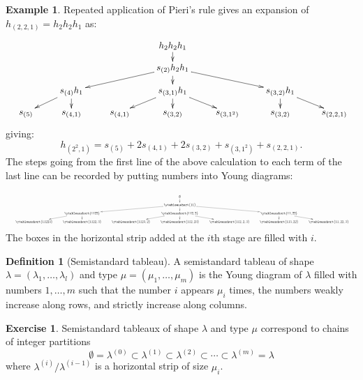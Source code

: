 \documentclass[11pt]{amsproc}
\theoremstyle{definition}
\newtheorem{definition}[theorem]{Definition}
\theoremstyle{example}
\newtheorem{example}[theorem]{Example}
\newtheorem{exercise}[theorem]{Exercise}
\begin{document}
\begin{example}
  \label{example:expansion-h}
  Repeated application of Pieri's rule gives an expansion of $h_{(2, 2, 1)} = h_2h_2h_1$ as:
  \begin{displaymath}
    \resizebox{\textwidth}{!}{
      \xymatrix@R-15pt{
        &&&h_2 h_2 h_1\ar[d]&&&\\
        &&&s_{(2)} h_2 h_1\ar[dll]\ar[d]\ar[drr]&&\\
        &s_{(4)}h_1\ar[dl]\ar[d] && s_{(3,1)}h_1\ar[dl]\ar[d]\ar[dr] && s_{(3,2)}h_1 \ar[d]\ar[dr]&\\
        s_{(5)} & s_{(4, 1)} & s_{(4,1)} & s_{(3, 2)} & s_{(3, 1^2)} & s_{(3,2)} & s_{(2,2,1)}
      }
    }
  \end{displaymath}
  giving:
  \begin{displaymath}
    h_{(2^2,1)} = s_{(5)} + 2s_{(4,1)} + 2s_{(3,2)} + s_{(3,1^2)} + s_{(2,2,1)}.
  \end{displaymath}
  The steps going from the first line of the above calculation to each term of the last line can be recorded by putting numbers into Young diagrams:
  \begin{displaymath}
    \resizebox{\textwidth}{!}{
      \xymatrix@R-15pt{
        &&&\emptyset\ar[d]&&&\\
        &&&\ytableaushort{11}\ar[dll]\ar[d]\ar[drr]&&\\
        &\ytableaushort{1122}\ar[dl]\ar[d] && \ytableaushort{112,2}\ar[dl]\ar[d]\ar[dr] && \ytableaushort{11,22}\ar[d]\ar[dr]&\\
        \ytableaushort{11223} & \ytableaushort{1122,3} & \ytableaushort{1123,2} & \ytableaushort{112,23} & \ytableaushort{112,2,3} & \ytableaushort{113,22} & \ytableaushort{11,22,3}
      }
    }
  \end{displaymath}
  The boxes in the horizontal strip added at the $i$th stage are filled with $i$.
\end{example}
\begin{definition}
  [Semistandard tableau]
  A semistandard tableau of shape $\lambda=(\lambda_1,\dotsc,\lambda_l)$ and type $\mu=(\mu_1,\dotsc,\mu_m)$ is the Young diagram of $\lambda$ filled with numbers $1,\dotsc, m$ such that the number $i$ appears $\mu_i$ times, the numbers weakly increase along rows, and strictly increase along columns.
\end{definition}
\begin{exercise}
  Semistandard tableaux of shape $\lambda$ and type $\mu$ correspond to chains of integer partitions
  \begin{displaymath}
    \emptyset = \lambda^{(0)} \subset \lambda^{(1)}\subset \lambda^{(2)} \subset \dotsb \subset \lambda^{(m)} = \lambda
  \end{displaymath}
  where $\lambda^{(i)}/\lambda^{(i-1)}$ is a horizontal strip of size $\mu_i$.
\end{exercise}
\end{document}
